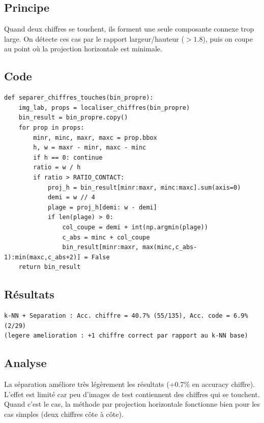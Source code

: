 \documentclass[a4paper,11pt]{article}
\begin{document}
\subsection{Principe}

Quand deux chiffres se touchent, ils forment une seule composante connexe trop large. On détecte ces cas par le rapport largeur/hauteur ($> 1.8$), puis on coupe au point où la projection horizontale est minimale.

\subsection{Code}

\begin{lstlisting}[style=python, caption={Séparation des chiffres en contact.}]
def separer_chiffres_touches(bin_propre):
    img_lab, props = localiser_chiffres(bin_propre)
    bin_result = bin_propre.copy()
    for prop in props:
        minr, minc, maxr, maxc = prop.bbox
        h, w = maxr - minr, maxc - minc
        if h == 0: continue
        ratio = w / h
        if ratio > RATIO_CONTACT:
            proj_h = bin_result[minr:maxr, minc:maxc].sum(axis=0)
            demi = w // 4
            plage = proj_h[demi: w - demi]
            if len(plage) > 0:
                col_coupe = demi + int(np.argmin(plage))
                c_abs = minc + col_coupe
                bin_result[minr:maxr, max(minc,c_abs-1):min(maxc,c_abs+2)] = False
    return bin_result
\end{lstlisting}

\subsection{Résultats}

\begin{lstlisting}[style=output, caption={Résultats avec séparation des chiffres.}]
k-NN + Separation : Acc. chiffre = 40.7% (55/135), Acc. code = 6.9% (2/29)
(legere amelioration : +1 chiffre correct par rapport au k-NN base)
\end{lstlisting}

\subsection{Analyse}

La séparation améliore très légèrement les résultats (+0.7\% en accuracy chiffre). L'effet est limité car peu d'images de test contiennent des chiffres qui se touchent. Quand c'est le cas, la méthode par projection horizontale fonctionne bien pour les cas simples (deux chiffres côte à côte).
\end{document}
